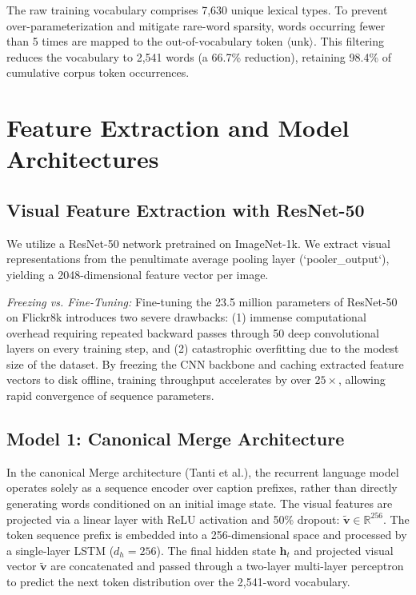 \documentclass[conference]{IEEEtran}
\begin{document}
The raw training vocabulary comprises 7,630 unique lexical types. To prevent over-parameterization and mitigate rare-word sparsity, words occurring fewer than 5 times are mapped to the out-of-vocabulary token $\langle\text{unk}\rangle$. This filtering reduces the vocabulary to 2,541 words (a 66.7\% reduction), retaining 98.4\% of cumulative corpus token occurrences.

\section{Feature Extraction and Model Architectures}
\subsection{Visual Feature Extraction with ResNet-50}
We utilize a ResNet-50 network pretrained on ImageNet-1k. We extract visual representations from the penultimate average pooling layer (`pooler\_output`), yielding a 2048-dimensional feature vector per image. 

\textit{Freezing vs. Fine-Tuning:} Fine-tuning the 23.5 million parameters of ResNet-50 on Flickr8k introduces two severe drawbacks: (1) immense computational overhead requiring repeated backward passes through 50 deep convolutional layers on every training step, and (2) catastrophic overfitting due to the modest size of the dataset. By freezing the CNN backbone and caching extracted feature vectors to disk offline, training throughput accelerates by over $25\times$, allowing rapid convergence of sequence parameters.

\subsection{Model 1: Canonical Merge Architecture}
In the canonical Merge architecture (Tanti et al.), the recurrent language model operates solely as a sequence encoder over caption prefixes, rather than directly generating words conditioned on an initial image state. The visual features are projected via a linear layer with ReLU activation and 50\% dropout: $\tilde{\mathbf{v}} \in \mathbb{R}^{256}$. The token sequence prefix is embedded into a 256-dimensional space and processed by a single-layer LSTM ($d_h = 256$). The final hidden state $\mathbf{h}_t$ and projected visual vector $\tilde{\mathbf{v}}$ are concatenated and passed through a two-layer multi-layer perceptron to predict the next token distribution over the 2,541-word vocabulary.
\end{document}
